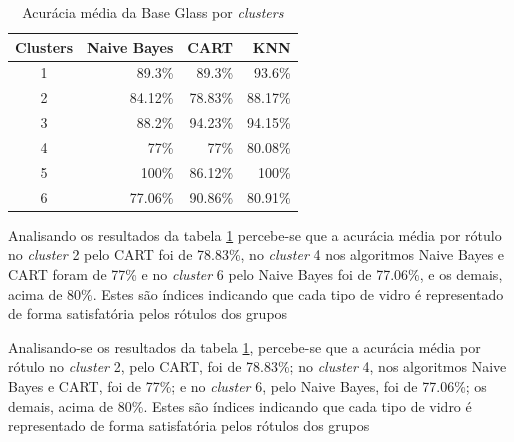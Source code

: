 \begin{table}[!h]
\centering
\caption{Acurácia média da Base Glass por \textit{clusters}}
\label{tab:acuracia:glass}
\begin{tabular}{c|r|r|r}
\hline
\rowcolor[HTML]{EFEFEF}
\textbf{Clusters} & \textbf{Naive Bayes} & \textbf{CART} & \textbf{KNN} \\ \hline
    1            & 89.3\%    &  89.3\% &    93.6\%     \\
    2            & 84.12\%  & 78.83\% &  88.17\%     \\
    3            & 88.2\%   & 94.23\% & 94.15\%   \\
    4            & 77\%     &  77\%     & 80.08\%   \\
    5            & 100\%    & 86.12\% &   100\% \\
    6            &  77.06\% & 90.86\%   &  80.91\%  \\
    
\end{tabular}
\end{table}



Analisando os resultados da tabela \ref{tab:acuracia:glass} percebe-se que a acurácia média por rótulo no \textit{cluster} 2 pelo CART foi de 78.83\%, no \textit{cluster} 4 nos algoritmos Naive Bayes e CART foram de 77\% e no \textit{cluster} 6 pelo Naive Bayes foi de 77.06\%, e os demais, acima de 80\%. Estes são índices indicando que cada tipo de vidro  é representado de forma satisfatória pelos rótulos dos grupos


Analisando-se os resultados da tabela \ref{tab:acuracia:glass}, percebe-se que a acurácia média por rótulo no \textit{cluster} 2, pelo CART, foi de 78.83\%; no \textit{cluster} 4, nos algoritmos Naive Bayes e CART, foi de 77\%; e no \textit{cluster} 6, pelo Naive Bayes, foi de 77.06\%; os demais, acima de 80\%. Estes são índices indicando que cada tipo de vidro é representado de forma satisfatória pelos rótulos dos grupos 



